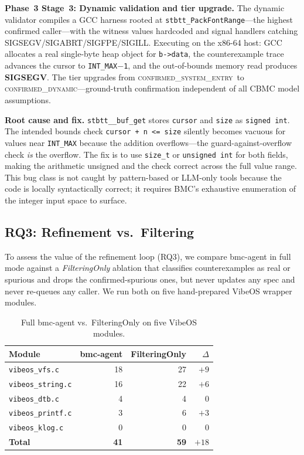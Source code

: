 \documentclass[11pt,a4paper]{article}
\newcommand{\tool}{bmc-agent\xspace}
\newcommand{\vibeos}{VibeOS\xspace}
\newcommand{\dynconf}{\textsc{confirmed\_dynamic}\xspace}
\newcommand{\sysconf}{\textsc{confirmed\_system\_entry}\xspace}
\begin{document}
\smallskip\noindent\textbf{Phase~3 Stage~3: Dynamic validation and tier
upgrade.}
The dynamic validator compiles a GCC harness rooted at
\texttt{stbtt\_PackFontRange}---the highest confirmed caller---with the
witness values hardcoded and signal handlers catching
SIGSEGV/SIGABRT/SIGFPE/SIGILL.
Executing on the x86-64 host: GCC allocates a real single-byte heap object
for \texttt{b->data}, the counterexample trace advances the cursor to
\texttt{INT\_MAX$-$1}, and the out-of-bounds memory read produces
\textbf{SIGSEGV}.  The tier upgrades from \sysconf\ to \dynconf---ground-truth
confirmation independent of all CBMC model assumptions.

\smallskip\noindent\textbf{Root cause and fix.}
\texttt{stbtt\_\_buf\_get} stores \texttt{cursor} and \texttt{size} as
\texttt{signed int}.  The intended bounds check \texttt{cursor + n <= size}
silently becomes vacuous for values near \texttt{INT\_MAX} because the
addition overflows---the guard-against-overflow check \emph{is} the overflow.
The fix is to use \texttt{size\_t} or \texttt{unsigned int} for both fields,
making the arithmetic unsigned and the check correct across the full value
range.  This bug class is not caught by pattern-based or LLM-only tools
because the code is locally syntactically correct; it requires BMC's
exhaustive enumeration of the integer input space to surface.

\subsection{RQ3: Refinement vs.\ Filtering}

To assess the value of the refinement loop (RQ3), we compare \tool in full
mode against a \emph{FilteringOnly} ablation that classifies counterexamples
as real or spurious and drops the confirmed-spurious ones, but never updates
any spec and never re-queues any caller. We run both on five hand-prepared
\vibeos wrapper modules.

\begin{table}[t]
\caption{Full \tool vs.\ FilteringOnly on five \vibeos modules.}
\label{tab:ablation}
\small
\begin{tabular}{lrrr}
\toprule
\textbf{Module} & \textbf{\tool} & \textbf{FilteringOnly} & \textbf{$\Delta$} \\
\midrule
\texttt{vibeos\_vfs.c}    & 18 & 27 & $+9$ \\
\texttt{vibeos\_string.c} & 16 & 22 & $+6$ \\
\texttt{vibeos\_dtb.c}    &  4 &  4 & $\phantom{+}0$ \\
\texttt{vibeos\_printf.c} &  3 &  6 & $+3$ \\
\texttt{vibeos\_klog.c}   &  0 &  0 & $\phantom{+}0$ \\
\midrule
\textbf{Total}            & \textbf{41} & \textbf{59} & $+18$ \\
\bottomrule
\end{tabular}
\end{table}
\end{document}
